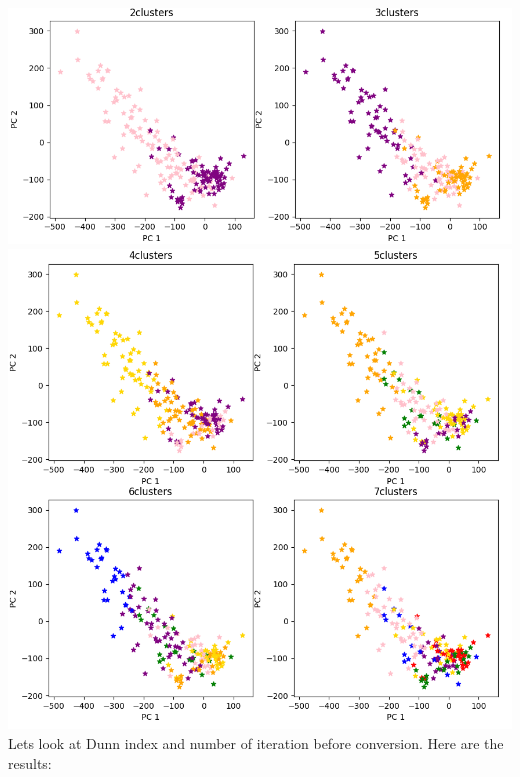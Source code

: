 \documentclass[12pt, letterpaper]{article}
\begin{document}
\begin{enumerate}[label=\Roman*.]
\begin{enumerate}[label=\arabic*.]
		
		 \includegraphics[scale=0.71]{clusters_raw1.png} \\
		  \includegraphics[scale=0.71]{clusters_raw.png} \\
		Lets look at Dunn index and number of iteration before conversion. Here are the results:\\ 

\end{enumerate}
\end{enumerate}
\end{document}
